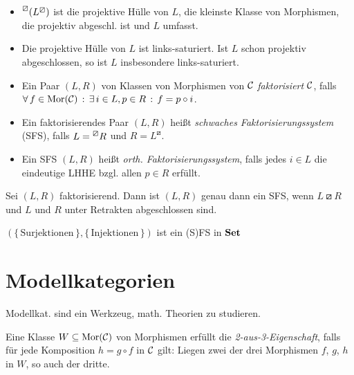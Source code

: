 \documentclass{cheat-sheet}
\newcommand{\lhhe}{\boxslash} %
\begin{document}
\begin{prop}
  \begin{itemize}
    \item $\prescript{\lhhe}{}(L^\lhhe)$ ist die projektive Hülle von $L$, \dh{} die kleinste Klasse von Morphismen, die projektiv abgeschl. ist und $L$ umfasst.
    \item Die projektive Hülle von $L$ ist links-saturiert.
    Ist $L$ schon projektiv abgeschlossen, so ist $L$ insbesondere links-saturiert.
  \end{itemize}
\end{prop}

\begin{defn}
  \begin{itemize}
    \item Ein Paar $(L, R)$ von Klassen von Morphismen von $\mathcal{C}$ \emph{faktorisiert} $\mathcal{C}$, falls
    $\forall \, {f \in \operatorname{Mor}(\mathcal{C})} \,:\, \exists \, {i \in L, p \in R} \,:\, f = p \circ i$.
    \item Ein faktorisierendes Paar $(L, R)$ heißt \emph{schwaches Faktorisierungssystem} (SFS), falls $L = \prescript{\lhhe}{} R$ und $R = L^\lhhe$.
    \item Ein SFS $(L, R)$ heißt \emph{orth. Faktorisierungssystem}, falls jedes $i \!\in\! L$ die eindeutige LHHE bzgl. allen $p \in R$ erfüllt.
  \end{itemize}
\end{defn}

\begin{prop}
  Sei $(L, R)$ faktorisierend. Dann ist $(L, R)$ genau dann ein SFS, wenn $L \lhhe R$ und $L$ und $R$ unter Retrakten abgeschlossen sind.
\end{prop}

\begin{bsp}
  $(\{ \, \text{Surjektionen} \, \}, \{ \, \text{Injektionen} \, \})$ ist ein (S)FS in $\mathbf{Set}$
\end{bsp}

\vfill
\columnbreak

\section{Modellkategorien}

\begin{motto}
  Modellkat. sind ein Werkzeug, math. Theorien zu studieren.
\end{motto}

\begin{defn}
  Eine Klasse $W \subseteq \operatorname{Mor}(\mathcal{C})$ von Morphismen erfüllt die \emph{2-aus-3-Eigenschaft}, falls für jede Komposition $h = g \circ f$ in $\mathcal{C}$ gilt: Liegen zwei der drei Morphismen $f$, $g$, $h$ in $W$, so auch der dritte.
\end{defn}
\end{document}
